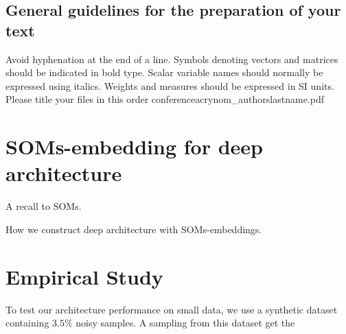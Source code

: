 \documentclass[3p,times,procedia]{elsarticle}
\begin{document}
\subsection{General guidelines for the preparation of your text}
Avoid hyphenation at the end of a line. Symbols denoting vectors and matrices should be indicated in bold type. Scalar variable names should normally be expressed using italics. Weights and measures should be expressed in SI units. Please title your files in this order conferenceacrynom\_authorslastname.pdf


\section{SOMs-embedding for deep architecture}
A recall to SOMs.

How we construct deep architecture with SOMs-embeddings.

\section{Empirical Study}
To test our architecture performance on small data, we 
use a synthetic dataset containing $3.5\%$ noisy samples. 
A sampling from this dataset get the
\end{document}
